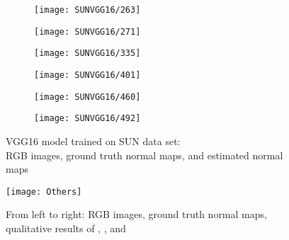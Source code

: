\begin{figure}
    \centering
    \begin{subfigure}[b]{0.3\textwidth}
        \texttt{[image: SUNVGG16/263]}
    \end{subfigure}
    \begin{subfigure}[b]{0.3\textwidth}
        \texttt{[image: SUNVGG16/271]}
    \end{subfigure}
    \begin{subfigure}[b]{0.3\textwidth}
        \texttt{[image: SUNVGG16/335]}
    \end{subfigure}
    
    \begin{subfigure}[b]{0.3\textwidth}
        \texttt{[image: SUNVGG16/401]}
    \end{subfigure}
    \begin{subfigure}[b]{0.3\textwidth}
        \texttt{[image: SUNVGG16/460]}
    \end{subfigure}
    \begin{subfigure}[b]{0.3\textwidth}
        \texttt{[image: SUNVGG16/492]}
    \end{subfigure}
    \caption{VGG16 model trained on SUN data set: \\ RGB images, ground truth normal maps, and estimated normal maps}
    \label{fig:sunvgg2}
\end{figure}


\begin{figure}
    \centering
    \texttt{[image: Others]}
    \caption{From left to right: RGB images, ground truth normal maps, \\ qualitative results of \citeauthor*{wang}, \citeauthor*{eigen}, and \citeauthor*{bansal} }
    \label{fig:others}
\end{figure}

